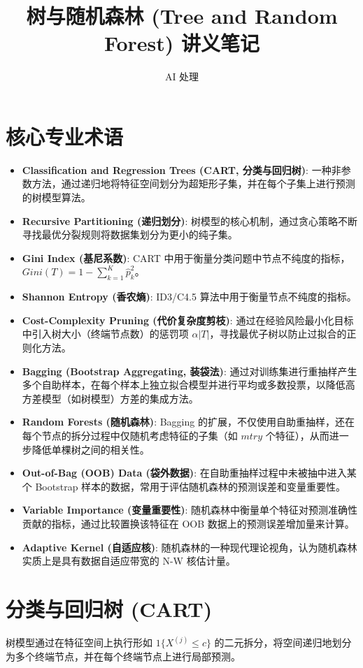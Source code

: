 \documentclass[UTF8]{ctexart}
\title{树与随机森林 (Tree and Random Forest) 讲义笔记}
\author{AI 处理}
\date{}
\begin{document}
\maketitle

\section{核心专业术语}
\begin{itemize}
    \item \textbf{Classification and Regression Trees (CART, 分类与回归树)}: 一种非参数方法，通过递归地将特征空间划分为超矩形子集，并在每个子集上进行预测的树模型算法。
    \item \textbf{Recursive Partitioning (递归划分)}: 树模型的核心机制，通过贪心策略不断寻找最优分裂规则将数据集划分为更小的纯子集。
    \item \textbf{Gini Index (基尼系数)}: CART 中用于衡量分类问题中节点不纯度的指标，$Gini(T) = 1 - \sum_{k=1}^K \hat{p}_k^2$。
    \item \textbf{Shannon Entropy (香农熵)}: ID3/C4.5 算法中用于衡量节点不纯度的指标。
    \item \textbf{Cost-Complexity Pruning (代价复杂度剪枝)}: 通过在经验风险最小化目标中引入树大小（终端节点数）的惩罚项 $\alpha |T|$，寻找最优子树以防止过拟合的正则化方法。
    \item \textbf{Bagging (Bootstrap Aggregating, 装袋法)}: 通过对训练集进行重抽样产生多个自助样本，在每个样本上独立拟合模型并进行平均或多数投票，以降低高方差模型（如树模型）方差的集成方法。
    \item \textbf{Random Forests (随机森林)}: Bagging 的扩展，不仅使用自助重抽样，还在每个节点的拆分过程中仅随机考虑特征的子集（如 $mtry$ 个特征），从而进一步降低单棵树之间的相关性。
    \item \textbf{Out-of-Bag (OOB) Data (袋外数据)}: 在自助重抽样过程中未被抽中进入某个 Bootstrap 样本的数据，常用于评估随机森林的预测误差和变量重要性。
    \item \textbf{Variable Importance (变量重要性)}: 随机森林中衡量单个特征对预测准确性贡献的指标，通过比较置换该特征在 OOB 数据上的预测误差增加量来计算。
    \item \textbf{Adaptive Kernel (自适应核)}: 随机森林的一种现代理论视角，认为随机森林实质上是具有数据自适应带宽的 N-W 核估计量。
\end{itemize}

\section{分类与回归树 (CART)}
树模型通过在特征空间上执行形如 $1\{X^{(j)} \le c\}$ 的二元拆分，将空间递归地划分为多个终端节点，并在每个终端节点上进行局部预测。
\end{document}
